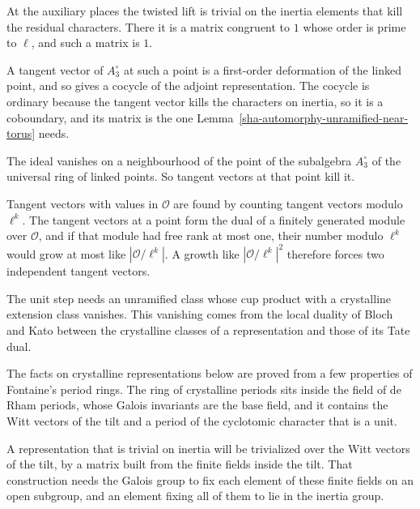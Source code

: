 At the auxiliary places the twisted lift is trivial on the inertia elements that kill the residual characters. There it is a matrix congruent to $1$ whose order is prime to $\ell$, and such a matrix is $1$.

A tangent vector of $A_3^\circ$ at such a point is a first-order deformation of the linked point, and so gives a cocycle of the adjoint representation. The cocycle is ordinary because the tangent vector kills the characters on inertia, so it is a coboundary, and its matrix is the one Lemma~\ref{sha-automorphy-unramified-near-torus} needs.

The ideal vanishes on a neighbourhood of the point of the subalgebra $A_3^\circ$ of the universal ring of linked points. So tangent vectors at that point kill it.

Tangent vectors with values in $\mathcal O$ are found by counting tangent vectors modulo $\ell^k$. The tangent vectors at a point form the dual of a finitely generated module over $\mathcal O$, and if that module had free rank at most one, their number modulo $\ell^k$ would grow at most like $|\mathcal O/\ell^k|$. A growth like $|\mathcal O/\ell^k|^2$ therefore forces two independent tangent vectors.

The unit step needs an unramified class whose cup product with a crystalline extension class vanishes. This vanishing comes from the local duality of Bloch and Kato between the crystalline classes of a representation and those of its Tate dual.

The facts on crystalline representations below are proved from a few properties of Fontaine's period rings. The ring of crystalline periods sits inside the field of de Rham periods, whose Galois invariants are the base field, and it contains the Witt vectors of the tilt and a period of the cyclotomic character that is a unit.

A representation that is trivial on inertia will be trivialized over the Witt vectors of the tilt, by a matrix built from the finite fields inside the tilt. That construction needs the Galois group to fix each element of these finite fields on an open subgroup, and an element fixing all of them to lie in the inertia group.

